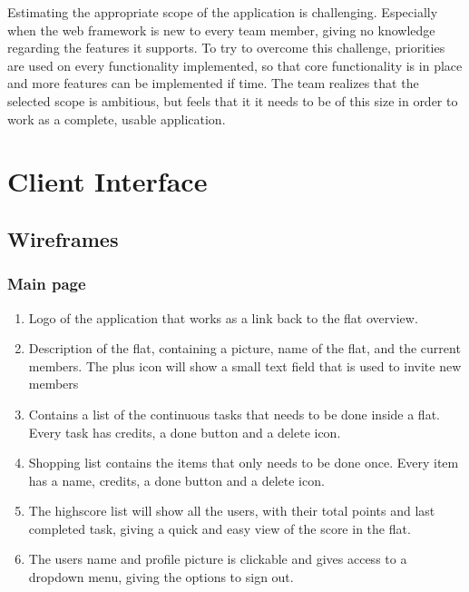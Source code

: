 \documentclass{sig-alt-release2}
\begin{document}
Estimating the appropriate scope of the application is challenging. Especially
when the web framework is new to every team member, giving no knowledge
regarding the features it supports. To try to overcome this challenge,
priorities are used on every functionality implemented, so that core
functionality is in place and more features can be implemented if time. The team
realizes that the selected scope is ambitious, but feels that it it needs to be
of this size in order to work as a complete, usable application.

\section{Client Interface}

\subsection{Wireframes}

\subsubsection{Main page}
\begin{enumerate}
\item Logo of the application that works as a link back to the flat overview. 
\item Description of the flat, containing a picture, name of the flat, and the
current members. The plus icon will show a small text field that is used to
invite new members
\item Contains a list of the continuous tasks that needs to be done inside a flat. Every task has credits, a done button and a delete icon. 
\item Shopping list contains the items that only needs to be done once. Every item has a name, credits, a done button and a delete icon. 
\item The highscore list will show all the users, with their total points and last completed task, giving a quick and easy view of the score in the flat. 
\item The users name and profile picture is clickable and gives access to a dropdown menu, giving the options to sign out. 
\end{enumerate}
\end{document}
